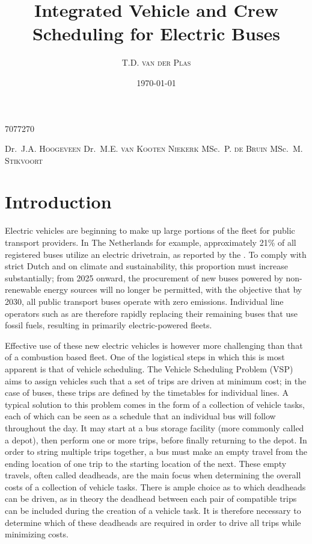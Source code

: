\documentclass[]{article}
\begin{document}
\title{Integrated Vehicle and Crew Scheduling for Electric Buses}
\author
    {T.D. \textsc{van der Plas}} %
    {7077270}           %
\date{\today}

\supervisors
    {Dr.~J.A. \textsc{Hoogeveen}} %
    {Dr.~M.E. \textsc{van Kooten Niekerk}} %
    {MSc.~P. \textsc{de Bruin}} %
    {MSc.~M. \textsc{Stikvoort}} %



\section{Introduction}
Electric vehicles are beginning to make up large portions of the fleet for public transport providers. In The Netherlands for example, approximately 21\% of all registered buses utilize an electric drivetrain, as reported by the \citet{RDW}. To comply with strict Dutch and \citet{europaRegulation20181999} on climate and sustainability, this proportion must increase substantially; from 2025 onward, the procurement of new buses powered by non-renewable energy sources will no longer be permitted, with the objective that by 2030, all public transport buses operate with zero emissions. Individual line operators such as \citet{qbuzzQbuzz} are therefore rapidly replacing their remaining buses that use fossil fuels, resulting in primarily electric-powered fleets.

Effective use of these new electric vehicles is however more challenging than that of a combustion based fleet. One of the logistical steps in which this is most apparent is that of vehicle scheduling. The Vehicle Scheduling Problem (VSP) aims to assign vehicles such that a set of trips are driven at minimum cost; in the case of buses, these trips are defined by the timetables for individual lines. A typical solution to this problem comes in the form of a collection of vehicle tasks, each of which can be seen as a schedule that an individual bus will follow throughout the day. It may start at a bus storage facility (more commonly called a depot), then perform one or more trips, before finally returning to the depot. In order to string multiple trips together, a bus must make an empty travel from the ending location of one trip to the starting location of the next. These empty travels, often called deadheads, are the main focus when determining the overall costs of a collection of vehicle tasks. There is ample choice as to which deadheads can be driven, as in theory the deadhead between each pair of compatible trips can be included during the creation of a vehicle task. It is therefore necessary to determine which of these deadheads are required in order to drive all trips while minimizing costs.
\end{document}

